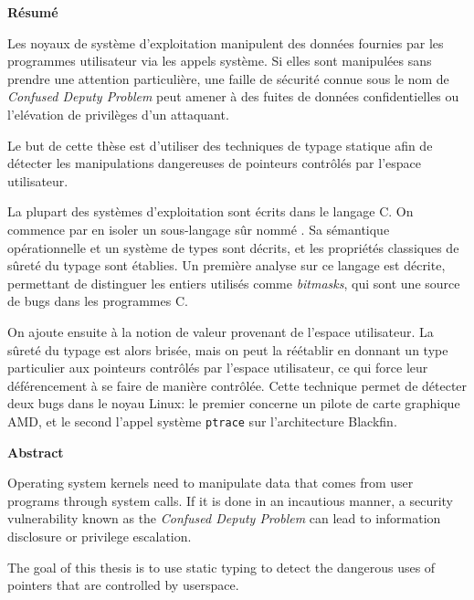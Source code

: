 \cleartoverso{}

\begin{headingpage}
\thispagestyle{empty}

\begin{center}\Large \textbf{Résumé}\end{center}

Les noyaux de système d'exploitation manipulent des données fournies par les
programmes utilisateur via les appels système. Si elles sont manipulées sans
prendre une attention particulière, une faille de sécurité connue sous le nom de
\emph{Confused Deputy Problem} peut amener à des fuites de données
confidentielles ou l'elévation de privilèges d'un attaquant.

Le but de cette thèse est d'utiliser des techniques de typage statique afin de
détecter les manipulations dangereuses de pointeurs contrôlés par l'espace
utilisateur.

La plupart des systèmes d'exploitation sont écrits dans le langage C. On
commence par en isoler un sous-langage sûr nommé \langname{}. Sa sémantique
opérationnelle et un système de types sont décrits, et les propriétés classiques
de sûreté du typage sont établies. Un première analyse sur ce langage est
décrite, permettant de distinguer les entiers utilisés comme \emph{bitmasks},
qui sont une source de bugs dans les programmes C.

On ajoute ensuite à \langname{} la notion de valeur provenant de
l'espace utilisateur. La sûreté du typage est alors brisée, mais on peut la
réétablir en donnant un type particulier aux pointeurs contrôlés par l'espace
utilisateur, ce qui force leur déférencement à se faire de manière contrôlée.
Cette technique permet de détecter deux bugs dans le noyau Linux: le premier
concerne un pilote de carte graphique AMD, et le second l'appel système
\texttt{ptrace} sur l'architecture Blackfin.

\begin{center}\Large \textbf{Abstract}\end{center}

Operating system kernels need to manipulate data that comes from user programs
through system calls. If it is done in an incautious manner, a security
vulnerability known as the \emph{Confused Deputy Problem} can lead to
information disclosure or privilege escalation.

The goal of this thesis is to use static typing to detect the dangerous uses of
pointers that are controlled by userspace.


\end{headingpage}
